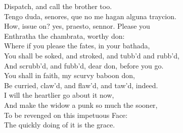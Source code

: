 \documentclass{memoir}
\begin{document}
\begin{drama*}
 Dispatch, and call the brother too.\\
\surlyspeaks {} Tengo duda, senores, que no me hagan alguna traycion.\\
\subtlespeaks  How, issue on? yes, praesto, sennor. Please you\\
 Enthratha the chambrata, worthy don:\\
 Where if you please the fates, in your bathada,\\
 You shall be soked, and stroked, and tubb'd and rubb'd,\\
 And scrubb'd, and fubb'd, dear don, before you go.\\
 You shall in faith, my scurvy baboon don,\\
 Be curried, claw'd, and flaw'd, and taw'd, indeed.\\
 I will the heartlier go about it now,\\
 And make the widow a punk so much the sooner,\\
 To be revenged on this impetuous Face:\\
 The quickly doing of it is the grace.\\
\scene


\end{drama*}
\end{document}
